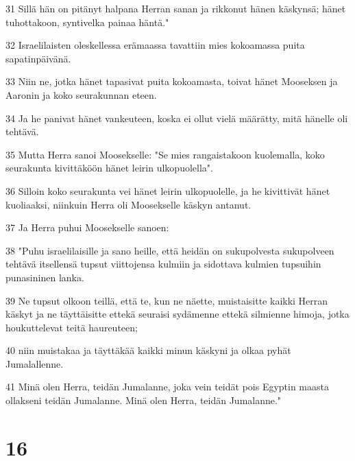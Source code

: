 \par 31 Sillä hän on pitänyt halpana Herran sanan ja rikkonut hänen käskynsä; hänet tuhottakoon, syntivelka painaa häntä."
\par 32 Israelilaisten oleskellessa erämaassa tavattiin mies kokoamassa puita sapatinpäivänä.
\par 33 Niin ne, jotka hänet tapasivat puita kokoamasta, toivat hänet Mooseksen ja Aaronin ja koko seurakunnan eteen.
\par 34 Ja he panivat hänet vankeuteen, koska ei ollut vielä määrätty, mitä hänelle oli tehtävä.
\par 35 Mutta Herra sanoi Moosekselle: "Se mies rangaistakoon kuolemalla, koko seurakunta kivittäköön hänet leirin ulkopuolella".
\par 36 Silloin koko seurakunta vei hänet leirin ulkopuolelle, ja he kivittivät hänet kuoliaaksi, niinkuin Herra oli Moosekselle käskyn antanut.
\par 37 Ja Herra puhui Moosekselle sanoen:
\par 38 "Puhu israelilaisille ja sano heille, että heidän on sukupolvesta sukupolveen tehtävä itsellensä tupsut viittojensa kulmiin ja sidottava kulmien tupsuihin punasininen lanka.
\par 39 Ne tupsut olkoon teillä, että te, kun ne näette, muistaisitte kaikki Herran käskyt ja ne täyttäisitte ettekä seuraisi sydämenne ettekä silmienne himoja, jotka houkuttelevat teitä haureuteen;
\par 40 niin muistakaa ja täyttäkää kaikki minun käskyni ja olkaa pyhät Jumalallenne.
\par 41 Minä olen Herra, teidän Jumalanne, joka vein teidät pois Egyptin maasta ollakseni teidän Jumalanne. Minä olen Herra, teidän Jumalanne."

\chapter{16}

